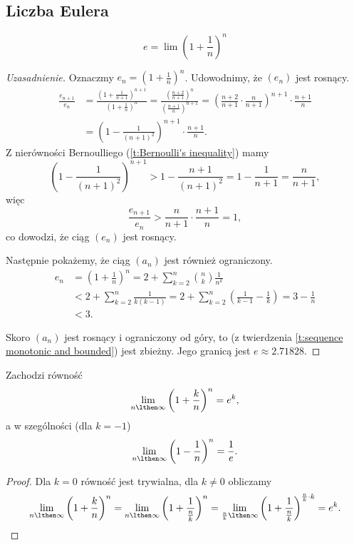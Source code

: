 \subsection{Liczba Eulera}
\begin{definition}
    \[ e = \lim \left(1 + \frac{1}{n}\right)^n \]
\end{definition}
\begin{proof}[Uzasadnienie]
    Oznaczmy $e_n = \left(1 + \frac{1}{n}\right)^n$. Udowodnimy, że $(e_n)$ jest rosnący.
    \[\begin{aligned}
        \frac{e_{n+1}}{e_n} &= \frac{\left(1 + \frac{1}{n+1}\right)^{n + 1}}{\left(1 + \frac{1}{n}\right)^n} = \frac{\left(\frac{n+ 2}{n+1}\right)^n}{\left(\frac{n+1}{n}\right)^{n+1}} = \left(\frac{n+2}{n+1} \cdot \frac{n}{n+1}\right)^{n+1} \cdot \frac{n+1}{n} \\
        &= \left(1 - \frac{1}{(n+1)^2}\right)^{n+1} \cdot \frac{n+1}{n}.
    \end{aligned}\]
    Z nierówności Bernoulliego (\ref{t:Bernoulli's inequality}) mamy
    \[ \left(1 - \frac{1}{(n+1)^2}\right)^{n+1} > 1 - \frac{n+1}{(n+1)^2} = 1 - \frac{1}{n+1} = \frac{n}{n+1}, \]
    więc
    \[ \frac{e_{n+1}}{e_n} > \frac{n}{n+1} \cdot \frac{n+1}{n} = 1, \]
    co dowodzi, że ciąg $(e_n)$ jest rosnący.

    Następnie pokażemy, że ciąg $(a_n)$ jest również ograniczony.
    \[\begin{aligned}
        e_n &= \left(1 + \frac{1}{n}\right)^n = 2 + \sum_{k=2}^n\binom{n}{k}\frac{1}{n^k} \\
        &< 2 + \sum_{k=2}^n\frac{1}{k(k-1)} = 2 + \sum_{k=2}^n\left(\frac{1}{k-1} - \frac{1}{k}\right) = 3 - \frac{1}{n} \\
        &< 3.
    \end{aligned}\]

    Skoro $(a_n)$ jest rosnący i ograniczony od góry, to (z twierdzenia \ref{t:sequence monotonic and bounded}) jest zbieżny. Jego granicą jest $e \approx 2.71828$.
\end{proof}

\begin{lemma}
    \label{l:lim e^k}
    Zachodzi równość
    \[ \lim_{n\lthen\infty}\left(1 + \frac{k}{n}\right)^n = e^k, \]
    a w szególności (dla $k = -1$)
    \[ \lim_{n\lthen\infty}\left(1 - \frac{1}{n}\right)^n = \frac{1}{e}. \]
\end{lemma}
\begin{proof}
    Dla $k = 0$ równość jest trywialna, dla $k \neq 0$ obliczamy
    \[ \lim_{n\lthen\infty}\left(1 + \frac{k}{n}\right)^n = \lim_{n\lthen\infty}\left(1 + \frac{1}{\frac{n}{k}}\right)^n = \lim_{\frac{n}{k}\lthen\infty}\left(1 + \frac{1}{\frac{n}{k}}\right)^{\frac{n}{k} \cdot k} = e^k. \]
\end{proof}

